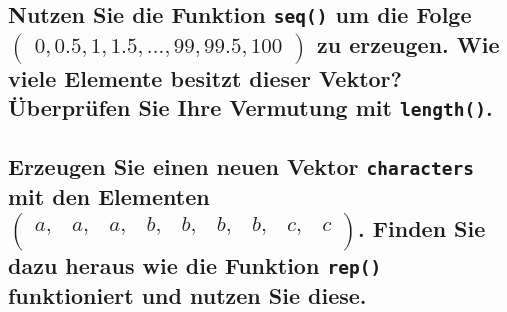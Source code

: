 \documentclass[12pt,a4paper]{article}
\begin{document}
\hypertarget{nutzen-sie-die-funktion-um-die-folge-beginpmatrix-0-0.5-1-1.5-ldots-99-99.5-100-endpmatrix-zu-erzeugen.-wie-viele-elemente-besitzt-dieser-vektor-uxfcberpruxfcfen-sie-ihre-vermutung-mit-.}{%
\subsection{\texorpdfstring{Nutzen Sie die Funktion \texttt{seq()} um
die Folge
\linebreak \(\begin{pmatrix} 0, 0.5, 1, 1.5, \ldots, 99, 99.5, 100 \end{pmatrix}\)
zu erzeugen. Wie viele Elemente besitzt dieser Vektor? Überprüfen Sie
Ihre Vermutung mit
\texttt{length()}.}{Nutzen Sie die Funktion  um die Folge \textbackslash begin\{pmatrix\} 0, 0.5, 1, 1.5, \textbackslash ldots, 99, 99.5, 100 \textbackslash end\{pmatrix\} zu erzeugen. Wie viele Elemente besitzt dieser Vektor? Überprüfen Sie Ihre Vermutung mit .}}\label{nutzen-sie-die-funktion-um-die-folge-beginpmatrix-0-0.5-1-1.5-ldots-99-99.5-100-endpmatrix-zu-erzeugen.-wie-viele-elemente-besitzt-dieser-vektor-uxfcberpruxfcfen-sie-ihre-vermutung-mit-.}}

\hypertarget{erzeugen-sie-einen-neuen-vektor-mit-den-elementen-beginpmatrix-a-a-a-b-b-b-b-c-c-endpmatrix.-finden-sie-dazu-heraus-wie-die-funktion-funktioniert-und-nutzen-sie-diese.}{%
\subsection{\texorpdfstring{Erzeugen Sie einen neuen Vektor
\texttt{characters} mit den Elementen
\(\begin{pmatrix} a, & a, & a, & b, & b, & b, & b, & c, & c \\ \end{pmatrix}\).
Finden Sie dazu heraus wie die Funktion \texttt{rep()} funktioniert und
nutzen Sie
diese.}{Erzeugen Sie einen neuen Vektor  mit den Elementen \textbackslash begin\{pmatrix\} a, \& a, \& a, \& b, \& b, \& b, \& b, \& c, \& c \textbackslash\textbackslash{} \textbackslash end\{pmatrix\}. Finden Sie dazu heraus wie die Funktion  funktioniert und nutzen Sie diese.}}\label{erzeugen-sie-einen-neuen-vektor-mit-den-elementen-beginpmatrix-a-a-a-b-b-b-b-c-c-endpmatrix.-finden-sie-dazu-heraus-wie-die-funktion-funktioniert-und-nutzen-sie-diese.}}
\end{document}
